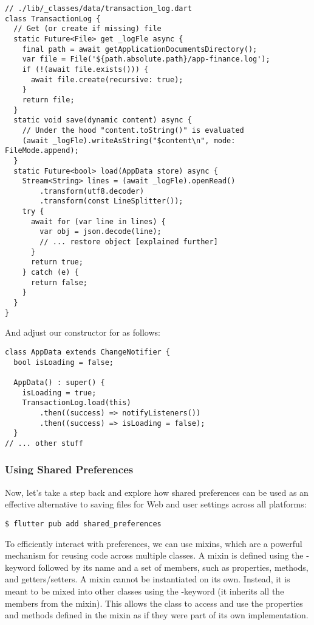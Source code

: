 \begin{lstlisting}
// ./lib/_classes/data/transaction_log.dart
class TransactionLog {
  // Get (or create if missing) file
  static Future<File> get _logFle async {
    final path = await getApplicationDocumentsDirectory();
    var file = File('${path.absolute.path}/app-finance.log');
    if (!(await file.exists())) {
      await file.create(recursive: true);
    }
    return file;
  }
  static void save(dynamic content) async {
    // Under the hood "content.toString()" is evaluated
    (await _logFle).writeAsString("$content\n", mode: FileMode.append);
  }
  static Future<bool> load(AppData store) async {
    Stream<String> lines = (await _logFle).openRead()
        .transform(utf8.decoder)
        .transform(const LineSplitter());
    try {
      await for (var line in lines) {
        var obj = json.decode(line);
        // ... restore object [explained further]
      }
      return true;
    } catch (e) {
      return false;
    }
  }
}
\end{lstlisting}

\noindent And adjust our constructor for  as follows:

\begin{lstlisting}
class AppData extends ChangeNotifier {
  bool isLoading = false;

  AppData() : super() {
    isLoading = true;
    TransactionLog.load(this)
        .then((success) => notifyListeners())
        .then((success) => isLoading = false);
  }
// ... other stuff
\end{lstlisting}


\subsubsection{Using Shared Preferences}

Now, let's take a step back and explore how shared preferences can be used as an effective alternative to saving files 
for Web and user settings across all platforms:

\begin{lstlisting}[language=terminal]
$ flutter pub add shared_preferences
\end{lstlisting}

\noindent To efficiently interact with preferences, we can use mixins, which are a powerful mechanism for reusing code 
across multiple classes. A mixin is defined using the -keyword followed by its name and a set of members, such 
as properties, methods, and getters/setters. A mixin cannot be instantiated on its own. Instead, it is meant to be mixed 
into other classes using the -keyword (it inherits all the members from the mixin). This allows the class to 
access and use the properties and methods defined in the mixin as if they were part of its own implementation.

